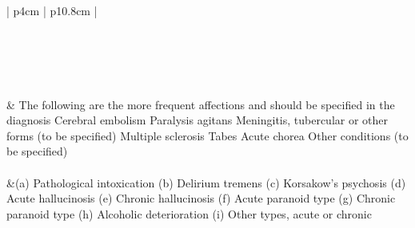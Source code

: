 \begin{longtable}[!t]{ | p{4cm} | p{10.8cm} | }
 \\ \hline
{} \\ \hline
{} \\ \hline
{} \\ \hline
{} \\ \hline
{} \\ \hline
 & The following are the more frequent affections and should be specified in the diagnosis\newline
     Cerebral embolism\newline
     Paralysis agitans\newline
     Meningitis, tubercular or other forms\newline
        (to be specified)\newline
     Multiple sclerosis\newline
     Tabes\newline
     Acute chorea\newline
     Other conditions (to be specified)\newline \\
 \\ \hline
 &(a) Pathological intoxication\newline
(b) Delirium tremens\newline
(c) Korsakow's psychosis\newline
(d) Acute hallucinosis\newline
(e) Chronic hallucinosis\newline
(f) Acute paranoid type\newline
(g) Chronic paranoid type\newline
(h) Alcoholic deterioration\newline
(i) Other types, acute or chronic\newline \\


\end{longtable}
